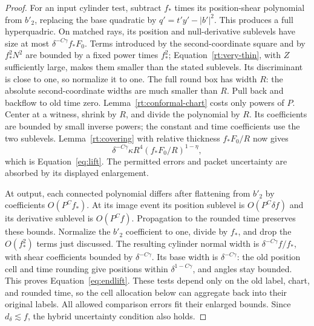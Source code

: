\begin{proof}
For an input cylinder test, subtract $f_*$ times its position-shear
polynomial from $b'_2$, replacing the base quadratic by
$q'=t'y'-|b'|^2$.  This produces a full hyperquadric.  On matched rays,
its position and null-derivative sublevels have size at most
$\delta^{-C\gamma}f_*F_0$.  Terms introduced by the second-coordinate
square and by $f_*^2N^2$ are bounded by a fixed power times $f_*^2$;
Equation~\eqref{rt:very-thin}, with $Z$ sufficiently large, makes
them smaller than the stated sublevels.  Its discriminant is close
to one, so normalize it to one.  The full round box has width $R$:
the absolute second-coordinate widths are much smaller than $R$.
Pull back and backflow to old time zero.  Lemma~\ref{rt:conformal-chart}
costs only powers of $P$.  Center at a witness, shrink by $R$, and
divide the polynomial by $R$.  Its coefficients are bounded by small
inverse powers; the constant and time coefficients use the two
sublevels.  Lemma~\ref{rt:covering} with relative thickness
$f_*F_0/R$ now gives
\[
 \delta^{-C\gamma}\kappa R^4(f_*F_0/R)^{1-\eta},
\]
which is Equation~\eqref{eq:lift}.  The permitted errors and packet
uncertainty are absorbed by its displayed enlargement.

At output, each connected polynomial differs after flattening from
$b'_2$ by coefficients $O(P^Cf_*)$.  At its image event its position
sublevel is $O(P^C\delta f)$ and its derivative sublevel is
$O(P^Cf)$.  Propagation to the rounded time preserves these bounds.
Normalize the $b'_2$ coefficient to one, divide by $f_*$, and drop
the $O(f_*^2)$ terms just discussed.  The resulting cylinder normal
width is $\delta^{-C\gamma}f/f_*$, with shear coefficients bounded
by $\delta^{-C\gamma}$.  Its base width is $\delta^{-C\gamma}$:
the old position cell and time rounding give positions within
$\delta^{1-C\gamma}$, and angles stay bounded.  This proves
Equation~\eqref{eq:endlift}.  These tests depend only on the old label,
chart, and rounded time, so the cell allocation below can aggregate
back into their original labels.  All allowed comparison errors fit
their enlarged bounds.  Since $d_\delta\lesssim f$, the hybrid
uncertainty condition also holds.
\end{proof}

